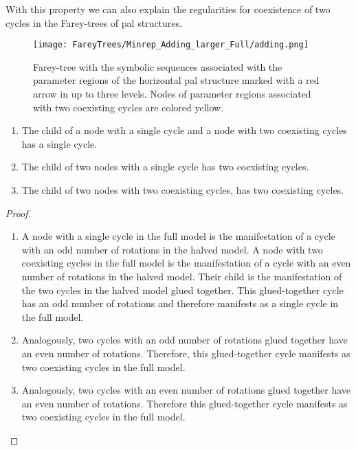 
With this property we can also explain the regularities for coexistence of two cycles in the Farey-trees of \gls{pal} structures.

\begin{figure}
	\centering
	\texttt{[image: FareyTrees/Minrep\_Adding\_larger\_Full/adding.png]}
	\caption[Farey-tree with the symbolic sequences of a horizontal  structure]{
		Farey-tree with the symbolic sequences associated with the parameter regions of the horizontal \gls{pal} structure marked with a red arrow in  up to three levels.
		Nodes of parameter regions associated with two coexisting cycles are colored yellow.
	}
	\label{fig:add.prop.hor.tree}
\end{figure}

\begin{theorem}
	\label{theorem:child.coexistence}
	\begin{enumerate}
		\item The child of a node with a single cycle and a node with two coexisting cycles has a single cycle.
		\item The child of two nodes with a single cycle has two coexisting cycles.
		\item The child of two nodes with two coexisting cycles, has two coexisting cycles.
	\end{enumerate}
\end{theorem}

\begin{proof} \phantom{x}
	\begin{enumerate}
		\item A node with a single cycle in the full model is the manifestation of a cycle with an odd number of rotations in the halved model.
		      A node with two coexisting cycles in the full model is the manifestation of a cycle with an even number of rotations in the halved model.
		      Their child is the manifestation of the two cycles in the halved model glued together.
		      This glued-together cycle has an odd number of rotations and therefore manifests as a single cycle in the full model.
		\item Analogously, two cycles with an odd number of rotations glued together have an even number of rotations.
		      Therefore, this glued-together cycle manifests as two coexisting cycles in the full model.
		\item Analogously, two cycles with an even number of rotations glued together have an even number of rotations.
		      Therefore this glued-together cycle manifests as two coexisting cycles in the full model.
	\end{enumerate}
\end{proof}

